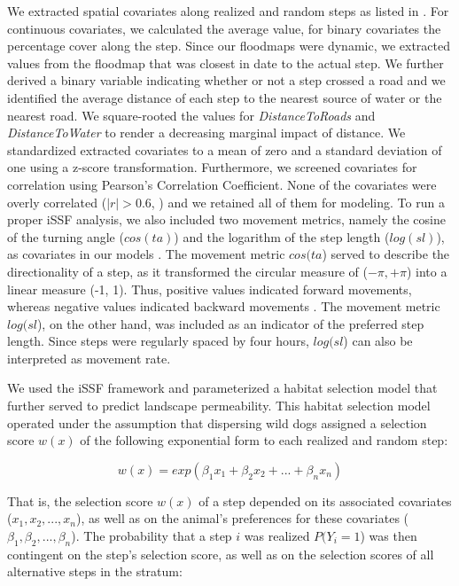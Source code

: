 \documentclass[abstract=on,10pt,a4paper,bibliography=totocnumbered]{scrartcl}
\begin{document}
We extracted spatial covariates along realized and random steps as listed in
. For continuous covariates, we calculated the average
value, for binary covariates the percentage cover along the step. Since our
floodmaps were dynamic, we extracted values from the floodmap that was closest
in date to the actual step. We further derived a binary variable indicating
whether or not a step crossed a road and we identified the average distance of
each step to the nearest source of water or the nearest road. We square-rooted
the values for \textit{DistanceToRoads} and \textit{DistanceToWater} to render a
decreasing marginal impact of distance. We standardized extracted covariates to
a mean of zero and a standard deviation of one using a z-score transformation.
Furthermore, we screened covariates for correlation using Pearson's Correlation
Coefficient. None of the covariates were overly correlated (\(|r| > 0.6\),
\citealp{Latham.2011}) and we retained all of them for modeling. To run a proper
iSSF analysis, we also included two movement metrics, namely the cosine of the
turning angle (\(cos(ta)\)) and the logarithm of the step length (\(log(sl)\)),
as covariates in our models \citep{Avgar.2016}. The movement metric \(cos(ta\))
served to describe the directionality of a step, as it transformed the circular
measure of (\(-\pi, +\pi\)) into a linear measure (-1, 1). Thus, positive values
indicated forward movements, whereas negative values indicated backward
movements \citep{Turchin.1998}. The movement metric \(log(sl\)), on the other
hand, was included as an indicator of the preferred step length. Since steps
were regularly spaced by four hours, \(log(sl\)) can also be interpreted as
movement rate.

\noindent We used the iSSF framework and parameterized a habitat selection model
that further served to predict landscape permeability. This habitat selection
model operated under the assumption that dispersing wild dogs assigned a
selection score \(w(x)\) of the following exponential form to each realized and
random step:

\begin{equation}
\label{EQ2}
  w(x) = exp(\beta_1 x_1 + \beta_2 x_2 + ... + \beta_n x_n)
\end{equation}

\noindent That is, the selection score \(w(x)\) of a step depended on its
associated covariates (\(x_1, x_2, ..., x_n\)), as well as on the animal's
preferences for these covariates (\(\beta_1, \beta_2, ..., \beta_n\)). The
probability that a step \(i\) was realized \(P(Y_{i} = 1\)) was then contingent
on the step's selection score, as well as on the selection scores of all
alternative steps in the stratum:
\end{document}
